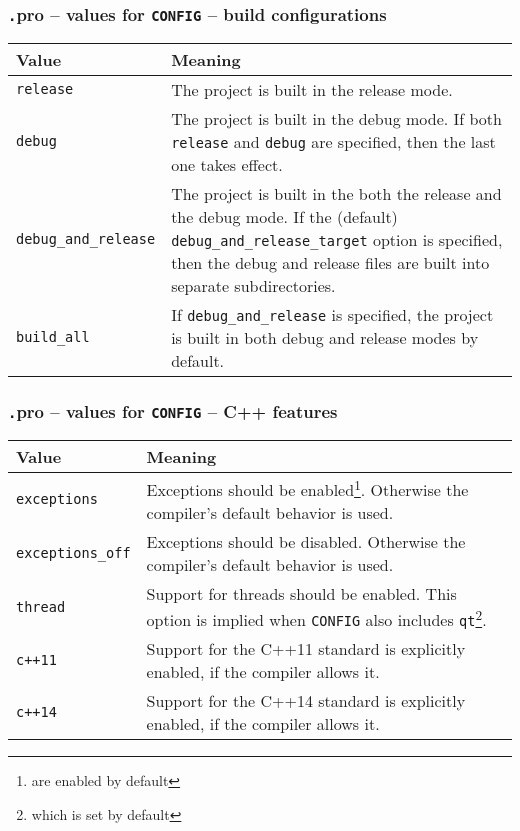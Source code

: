 \begin{frame}
\frametitle{{\texttt .pro} -- values for \texttt{CONFIG} -- build configurations}
  \begin{center}
  \begin{tabular}{|p{}|p{}|}
    \hline
    \textbf{Value} & \textbf{Meaning} \\
    \hline
    \texttt{release} & The project is built in the release mode. \\
    \hline
    \texttt{debug} & The project is built in the debug mode. If both
    \texttt{release} and \texttt{debug} are specified, then the last one takes
    effect.\\
    \hline
    \texttt{debug\_and\_release} & The project is built in the both the release 
    and the debug mode.
    If the (default) \texttt{debug\_and\_release\_target} option is specified,
    then the debug and release files are built into separate subdirectories.
    \\
    \hline
    \texttt{build\_all} & If \texttt{debug\_and\_release} is specified,
    the project is built in both debug and release modes by default.  \\
    \hline
  \end{tabular}
  \end{center}
\end{frame}

\begin{frame}
\frametitle{{\texttt .pro} -- values for \texttt{CONFIG} -- C++ features}
  \begin{center}
  \begin{tabular}{|p{}|p{}|}
    \hline
    \textbf{Value} & \textbf{Meaning} \\
    \hline
    \texttt{exceptions} & Exceptions should be enabled\footnote{are enabled
    by default}.  Otherwise the compiler's default behavior is used.\\
    \hline
    \texttt{exceptions\_off} & Exceptions should be disabled.
    Otherwise the compiler's default behavior is used.\\
    \hline
    \texttt{thread} & Support for threads should be enabled.
    This option is implied when \texttt{CONFIG} also includes \texttt{qt}\footnote
    {which is set by default}.\\
    \hline
    \texttt{c++11} & Support for the C++11 standard is explicitly enabled, if
    the compiler allows it. \\
    \hline
    \texttt{c++14} & Support for the C++14 standard is explicitly enabled, if
    the compiler allows it. \\
    \hline
  \end{tabular}
  \end{center}
\end{frame}

